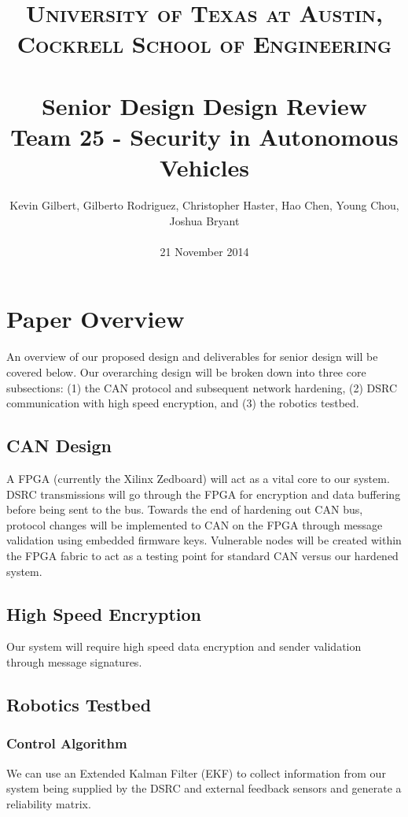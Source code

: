 \documentclass[paper=a4, fontsize=11pt]{scrartcl}
\title{
		\usefont{OT1}{bch}{b}{n}
		\normalfont \normalsize \textsc{University of Texas at Austin, Cockrell School of Engineering} \\ [25pt]
		\horrule{0.5pt} \\[0.4cm]
		\huge Senior Design Design Review\\
        Team 25 - Security in Autonomous Vehicles
		\horrule{2pt} \\[0.5cm]
}
\author{
		\normalfont \normalsize
        Kevin Gilbert, Gilberto Rodriguez, Christopher Haster, Hao Chen, Young Chou, Joshua Bryant\\[-3pt]\\
        \normalsize
        21 November 2014
}
\date{}
\numberwithin{equation}{section}		%
\numberwithin{figure}{section}			%
\numberwithin{table}{section}				%
\begin{document}
\maketitle

\newpage

\section{Paper Overview}
An overview of our proposed design and deliverables for senior design will be covered below. Our overarching design will be broken down into three core subsections: (1) the CAN protocol and subsequent network hardening, (2) DSRC communication with high speed encryption, and (3) the robotics testbed.

\subsection{CAN Design}
A FPGA (currently the Xilinx Zedboard) will act as a vital core to our system. DSRC transmissions will go through the FPGA for encryption and data buffering before being sent to the bus. Towards the end of hardening out CAN bus, protocol changes will be implemented to CAN on the FPGA through message validation using embedded firmware keys. Vulnerable nodes will be created within the FPGA fabric to act as a testing point for standard CAN versus our hardened system. 

\subsection{High Speed Encryption}
Our system will require high speed data encryption and sender validation through message signatures. 

\subsection{Robotics Testbed}

\subsubsection{Control Algorithm}
We can use an Extended Kalman Filter (EKF) to collect information from our system being supplied by the DSRC and external feedback sensors and generate a reliability matrix. 

\newpage
\end{document}
